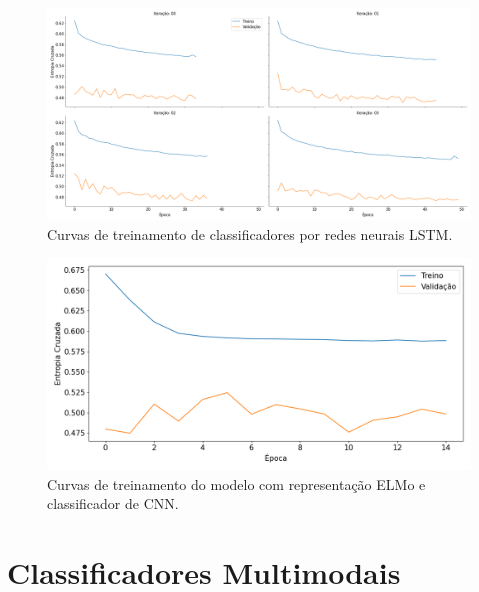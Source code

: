 \begin{figure}[h]
\begin{center} {
    \begin{center}
    \includegraphics[scale=0.25]{images/lstm_train.png}
    \caption{Curvas de treinamento de classificadores por redes neurais LSTM.}
    \label{fig:lstm_train}
    \end{center}
}
\end{center}
\end{figure}

\begin{figure}[h]
\begin{center} {
    \begin{center}
    \includegraphics[scale=0.45]{images/elmo_cnn_train.png}
    \caption{Curvas de treinamento do modelo com representação ELMo e classificador de CNN.}
    \label{fig:elmo_train}
    \end{center}
}
\end{center}
\end{figure}

\section{Classificadores Multimodais}

